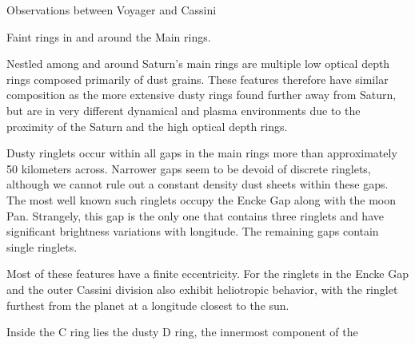 Observations between Voyager and Cassini


Faint rings in and around the Main rings. 

Nestled among and around Saturn's main rings are multiple low optical depth rings composed primarily of dust grains. These features therefore have similar composition as the more extensive dusty rings found further away from Saturn, but are in very different dynamical and plasma environments due to the proximity of the Saturn and the high optical depth rings. 

Dusty ringlets occur within all gaps in the main rings more than approximately 50 kilometers across. Narrower gaps seem to be devoid of discrete ringlets, although we cannot rule out a constant density dust sheets within these gaps. The most well known such ringlets occupy the Encke Gap along with the moon Pan. Strangely, this gap is the only one that contains three ringlets and have significant brightness variations with longitude. The remaining gaps contain single ringlets. 

Most of these features have a finite eccentricity. For the ringlets in the Encke Gap and the outer Cassini division also exhibit heliotropic behavior, with the ringlet furthest  from the planet at a longitude closest to the sun.

Inside the C ring lies the dusty D ring, the innermost component of the 